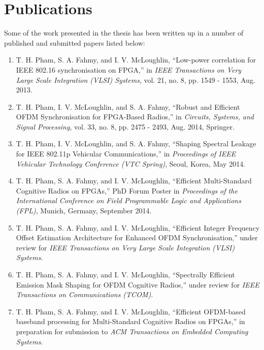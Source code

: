 \section{Publications}
Some of the work presented in the thesis has been written up in a number of published and submitted papers listed below:

\begin{enumerate}

\item  T. H. Pham, S. A. Fahmy, and I. V. McLoughlin, ``Low-power correlation for IEEE 802.16 synchronisation on FPGA,'' in \textit{IEEE Transactions on Very Large Scale Integration (VLSI) Systems}, vol. 21, no. 8, pp. 1549 - 1553, Aug. 2013.

\item T. H. Pham, I. V. McLoughlin, and S. A. Fahmy, ``Robust and Efficient OFDM Synchronisation for FPGA-Based Radios,'' in \textit{Circuits, Systems, and Signal Processing}, vol. 33, no. 8, pp. 2475 - 2493, Aug. 2014, Springer.

\item  T. H. Pham, I. V. McLoughlin, and S. A. Fahmy, ``Shaping Spectral Leakage for IEEE 802.11p Vehicular Communications,'' in \textit{Proceedings of IEEE Vehicular Technology Conference (VTC Spring)}, Seoul, Korea, May 2014.

\item T. H. Pham, S. A. Fahmy, and I. V. McLoughlin, ``Efficient Multi-Standard Cognitive Radios on FPGAs,'' PhD Forum Poster in \textit{Proceedings of the International Conference on Field Programmable Logic and Applications (FPL)}, Munich, Germany, September 2014.

\item T. H. Pham, S. A. Fahmy, and I. V. McLoughlin, ``Efficient Integer Frequency Offset Estimation Architecture for Enhanced OFDM Synchronisation,'' under review for \textit{IEEE Transactions on Very Large Scale Integration (VLSI) Systems}.

\item T. H. Pham, S. A. Fahmy, and I. V. McLoughlin, ``Spectrally Efficient Emission Mask Shaping for OFDM Cognitive Radios,'' under review for \textit{IEEE Transactions on Communications (TCOM)}.

\item T. H. Pham, S. A. Fahmy, and I. V. McLoughlin, ``Efficient OFDM-based baseband processing for Multi-Standard Cognitive Radios on FPGAs,'' in preparation for submission to \emph{ACM Transactions on Embedded Computing Systems}.

\end{enumerate}
